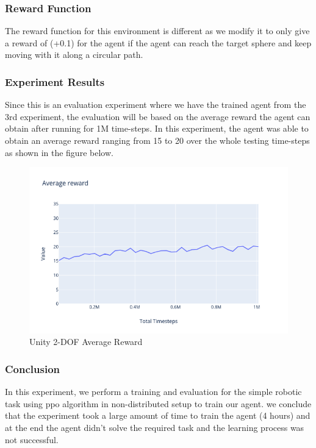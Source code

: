 \subsubsection{Reward Function}

The reward function for this environment is different as we modify it to only give a reward of (+0.1) for the agent if the agent can reach the target sphere and keep moving with it along a circular path.


\subsubsection{Experiment Results}

Since this is an evaluation experiment where we have the trained agent from the 3rd experiment, the evaluation will be based on the average reward the agent can obtain after running for 1M time-steps. In this experiment, the agent was able to obtain an average reward ranging from 15 to 20 over the whole testing time-steps as shown in the figure below.

\begin{figure}[!htb]
		\centering
				\includegraphics[width=\linewidth]{figures/exps/unity2d.png}
				\caption{Unity 2-DOF Average Reward}
				\label{fig:unity2d_avg_reward}
\end{figure}


\subsubsection{Conclusion}

In this experiment, we perform a training and evaluation for the simple robotic task using ppo algorithm in non-distributed setup to train our agent. we conclude that the experiment took a large amount of time to train the agent (4 hours) and at the end the agent didn't solve the required task and the learning process was not successful. 